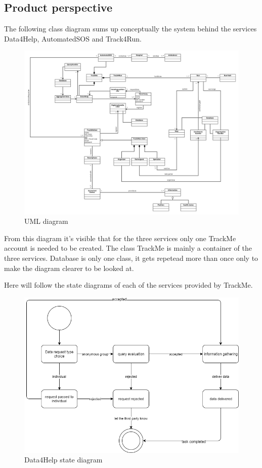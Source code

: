 \color{black}
{\color{secblue}\subsection{Product perspective}}
The following class diagram sums up conceptually the system behind the services Data4Help, AutomatedSOS and Track4Run.
\begin{figure}[H]
\includegraphics[width=\linewidth]{./Images/RASD_UML.png}
\centering
\caption{UML diagram}
\end{figure}
From this diagram it's visible that for the three services only one TrackMe account is needed to be created.
The class TrackMe is mainly a container of the three services.
Database is only one class, it gets repetead more than once only to make the diagram clearer to be looked at.

\newpage
Here will follow the state diagrams of each of the services provided by TrackMe.

\begin{figure}[H]
    \includegraphics[width=\linewidth]{./Images/RASD_State_Diagram.png}
    \centering
    \caption{Data4Help state diagram}
  \end{figure}
  
